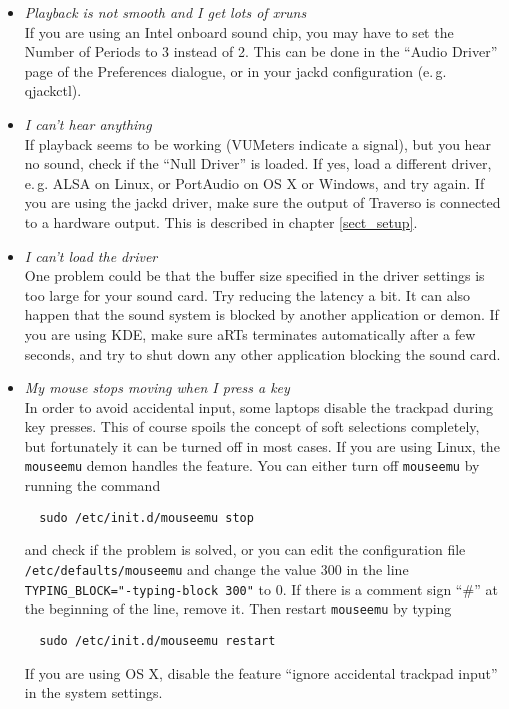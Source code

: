 \begin{itemize}
 \item \textit{Playback is not smooth and I get lots of xruns}\\
  If you are using an Intel onboard sound chip, you may have to set the Number of Periods to 3 instead of 2. This can be done in the ``Audio Driver'' page of the Preferences dialogue, or in your jackd configuration (e.\,g. qjackctl).

 \item \textit{I can't hear anything}\\
  If playback seems to be working (VUMeters indicate a signal), but you hear no sound, check if the ``Null Driver'' is loaded. If yes, load a different driver, e.\,g. ALSA on Linux, or PortAudio on OS X or Windows, and try again. If you are using the jackd driver, make sure the output of Traverso is connected to a hardware output. This is described in chapter \ref{sect_setup}.

 \item \textit{I can't load the driver}\\
  One problem could be that the buffer size specified in the driver settings is too large for your sound card. Try reducing the latency a bit. It can also happen that the sound system is blocked by another application or demon. If you are using KDE, make sure aRTs terminates automatically after a few seconds, and try to shut down any other application blocking the sound card.

 \item \textit{My mouse stops moving when I press a key}\\
  In order to avoid accidental input, some laptops disable the trackpad during key presses. This of course spoils the concept of soft selections completely, but fortunately it can be turned off in most cases. If you are using Linux, the \texttt{mouseemu} demon handles the feature. You can either turn off \texttt{mouseemu} by running the command 
  \begin{verbatim}
  sudo /etc/init.d/mouseemu stop
  \end{verbatim}
  and check if the problem is solved, or you can edit the configuration file \texttt{/etc/defaults/mouseemu} and change the value 300 in the line \texttt{TYPING\_BLOCK="-typing-block 300"} to 0. If there is a comment sign ``\#'' at the beginning of the line, remove it. Then restart \texttt{mouseemu} by typing
  \begin{verbatim}
  sudo /etc/init.d/mouseemu restart
  \end{verbatim}

 If you are using OS X, disable the feature ``ignore accidental trackpad input'' in the system settings.
\end{itemize}


